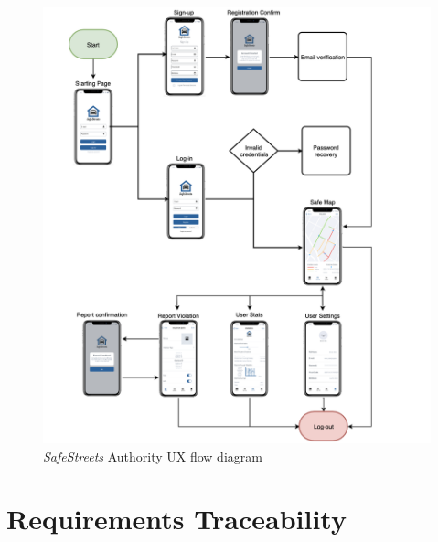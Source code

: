 \documentclass{article}
\begin{document}
	\begin{figure}[H]
			\centering
			\includegraphics[scale=0.5]{Images/UX/authority_ux_flow.png}
			\caption{{\it SafeStreets} Authority UX flow diagram}
	\end{figure}

\pagebreak

\section{Requirements Traceability}
	
\end{document}

